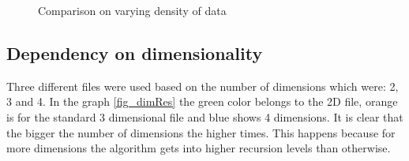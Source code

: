 \begin{figure}
\begin{minipage}{.5\linewidth}
\centering
{}
\end{minipage}%
\begin{minipage}{.5\linewidth}
\centering
{}
\end{minipage}\par\medskip

\caption{Comparison on varying density of data}
\label{fig_densRes}
\end{figure}

\subsection{Dependency on dimensionality}
Three different files were used based on the number of dimensions which were: 2, 3 and 4. In the graph \ref{fig_dimRes} the green color belongs to the 2D file, orange is for the standard 3 dimensional file and blue shows 4 dimensions. It is clear that the bigger the number of dimensions the higher times. This happens because for more dimensions the algorithm gets into higher recursion levels than otherwise.


